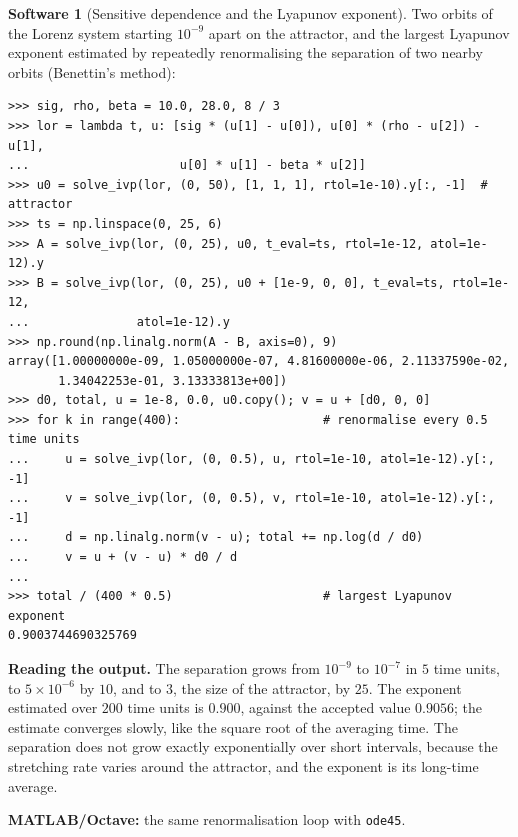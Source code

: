 \documentclass[11pt,a4paper]{article}
\numberwithin{equation}{section}
\theoremstyle{definition}
\newtheorem{software}[thm]{Software}
\begin{document}
\begin{software}[Sensitive dependence and the Lyapunov exponent]
\label{sw:lorenz}
Two orbits of the Lorenz system starting $10^{-9}$ apart on the attractor, and the largest Lyapunov exponent estimated by repeatedly renormalising the separation of two nearby orbits (Benettin's
method):
{\small\begin{verbatim}
>>> sig, rho, beta = 10.0, 28.0, 8 / 3
>>> lor = lambda t, u: [sig * (u[1] - u[0]), u[0] * (rho - u[2]) - u[1],
...                     u[0] * u[1] - beta * u[2]]
>>> u0 = solve_ivp(lor, (0, 50), [1, 1, 1], rtol=1e-10).y[:, -1]  # attractor
>>> ts = np.linspace(0, 25, 6)
>>> A = solve_ivp(lor, (0, 25), u0, t_eval=ts, rtol=1e-12, atol=1e-12).y
>>> B = solve_ivp(lor, (0, 25), u0 + [1e-9, 0, 0], t_eval=ts, rtol=1e-12,
...               atol=1e-12).y
>>> np.round(np.linalg.norm(A - B, axis=0), 9)
array([1.00000000e-09, 1.05000000e-07, 4.81600000e-06, 2.11337590e-02,
       1.34042253e-01, 3.13333813e+00])
>>> d0, total, u = 1e-8, 0.0, u0.copy(); v = u + [d0, 0, 0]
>>> for k in range(400):                    # renormalise every 0.5 time units
...     u = solve_ivp(lor, (0, 0.5), u, rtol=1e-10, atol=1e-12).y[:, -1]
...     v = solve_ivp(lor, (0, 0.5), v, rtol=1e-10, atol=1e-12).y[:, -1]
...     d = np.linalg.norm(v - u); total += np.log(d / d0)
...     v = u + (v - u) * d0 / d
...
>>> total / (400 * 0.5)                     # largest Lyapunov exponent
0.9003744690325769
\end{verbatim}}
\textbf{Reading the output.} The separation grows from $10^{-9}$ to $10^{-7}$ in $5$ time units, to $5 \times 10^{-6}$ by $10$, and to $3$, the size of the attractor, by $25$. The exponent estimated over $200$ time units is $0.900$, against the
accepted value $0.9056$; the estimate converges slowly, like the square root of the averaging time. The separation does not grow exactly exponentially over short intervals, because the
stretching rate varies around the attractor, and the exponent is its long-time average.

\textbf{MATLAB/Octave:} the same renormalisation loop with \texttt{ode45}.
\end{software}
\end{document}
